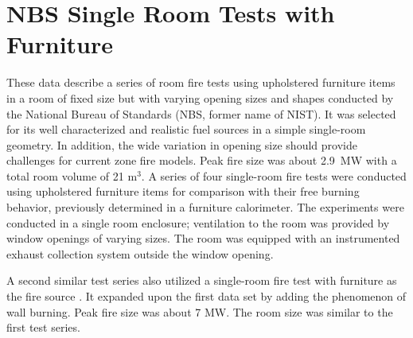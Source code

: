 \clearpage

\section{NBS Single Room Tests with Furniture}

These data describe a series of room fire tests using upholstered furniture items in a room of fixed size but with varying opening sizes and shapes \cite{Valid:Babrauskas_Flashover} conducted by the National Bureau of Standards (NBS, former name of NIST). It was selected for its well characterized and realistic fuel sources in a simple single-room geometry. In addition, the wide variation in opening size should provide challenges for current zone fire models. Peak fire size was about 2.9~MW with a total room volume of 21 m$^3$. A series of four single-room fire tests were conducted using upholstered furniture items for comparison with their free burning behavior, previously determined in a furniture calorimeter.  The experiments were conducted in a single room enclosure; ventilation to the room was provided by window openings of  varying sizes. The room was equipped with an instrumented exhaust collection system outside the window opening.  

A second similar test series also utilized a single-room fire test with furniture as the fire source \cite{Lee:1985}. It expanded upon the first data set by adding the phenomenon of wall burning. Peak fire size was about 7 MW. The room size was similar to the first test series.

